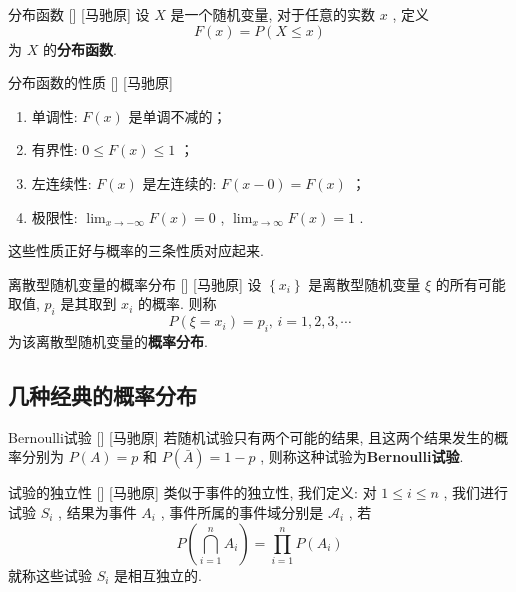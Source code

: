 \documentclass[UTF8]{ctexart}
\begin{document}
        \begin{dfn}
            []
            {分布函数}
            []
            [马驰原]
            设 \(X\) 是一个随机变量, 对于任意的实数 \(x\) , 定义\[F(x)=P(X\leq x)\]为 \(X\) 的\textbf{分布函数}. 
        \end{dfn}

        \begin{ppt}
            []
            {分布函数的性质}
            []
            [马驰原]
            \begin{enumerate}
                \item 单调性:  \(F(x)\) 是单调不减的；
                \item 有界性:  \(0\leq F(x)\leq 1\) ；
                \item 左连续性:  \(F(x)\) 是左连续的:  \(F(x-0)=F(x)\) ；
                \item 极限性:  \(\lim_{x\to-\infty}F(x)=0\) ,  \(\lim_{x\to\infty}F(x)=1\) . 
            \end{enumerate}
        \end{ppt}

        这些性质正好与概率的三条性质对应起来. 

        \begin{dfn}
            []
            {离散型随机变量的概率分布}
            []
            [马驰原]
            设 \(\left\{x_i\right\} \) 是离散型随机变量 \(\xi\) 的所有可能取值,  \(p_i\) 是其取到 \(x_i\) 的概率. 则称
            \[P(\xi=x_i)=p_i,\,i=1,2,3,\cdots\]为该离散型随机变量的\textbf{概率分布}. 
        \end{dfn}

    \subsection{几种经典的概率分布}
        \begin{dfn}
            []
            {Bernoulli试验}
            []
            [马驰原]
            若随机试验只有两个可能的结果, 且这两个结果发生的概率分别为 \(P(A)=p\) 和 \(P(\bar{A})=1-p\) , 则称这种试验为\textbf{Bernoulli试验}. 
        \end{dfn}

        \begin{dfn}
            []
            {试验的独立性}
            []
            [马驰原]
            类似于事件的独立性, 我们定义: 对 \(1\leq i\leq n\) , 我们进行试验 \(S_i\) , 结果为事件 \(A_i\) , 事件所属的事件域分别是 \(\mathcal{A}_i\) , 若\[P\left(\bigcap^{n}_{i=1} A_i\right) =\prod_{i=1}^{n}P(A_i)\]
            就称这些试验 \(S_i\) 是相互独立的. 
        \end{dfn}
\end{document}
